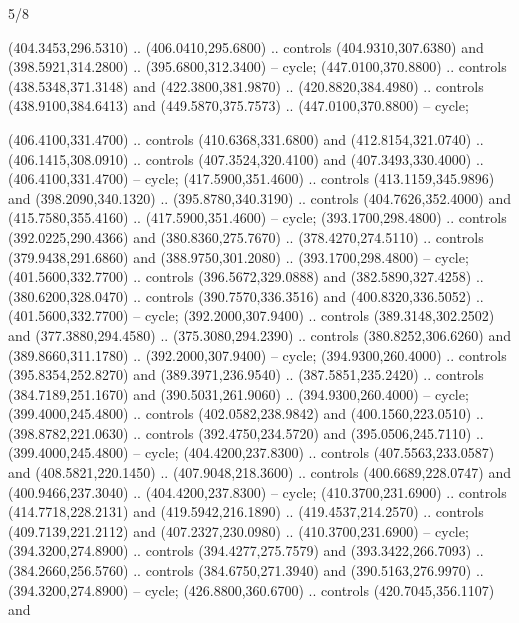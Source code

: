 \begin{flagdescription}{5/8}
\begin{scope}[shift={(0.5\flaglength,0.5\flagwidth)},scale=\flagwidth*\stretchfactor/820]
\begin{scope}[scale=1.84,xshift=-135mm,yshift=84mm]
\begin{scope}[y=0.80pt, x=0.80pt, yscale=-1, xscale=1]
\begin{scope}[cm={{1.01416,0.0,0.0,1.033,(-6.79641,-9.89449)}}]
\begin{scope}[draw=c24420e]
\begin{scope}[line width=0.131\lw]
\begin{scope}[fill=c67923d]
  (404.3453,296.5310) .. (406.0410,295.6800) .. controls (404.9310,307.6380) and
  (398.5921,314.2800) .. (395.6800,312.3400) -- cycle;
 (447.0100,370.8800) .. controls (438.5348,371.3148) and
  (422.3800,381.9870) .. (420.8820,384.4980) .. controls (438.9100,384.6413) and
  (449.5870,375.7573) .. (447.0100,370.8800) -- cycle;
\end{scope}
\begin{scope}[fill=c406325]
 (406.4100,331.4700) .. controls (410.6368,331.6800) and
  (412.8154,321.0740) .. (406.1415,308.0910) .. controls (407.3524,320.4100) and
  (407.3493,330.4000) .. (406.4100,331.4700) -- cycle;
 (417.5900,351.4600) .. controls (413.1159,345.9896) and
  (398.2090,340.1320) .. (395.8780,340.3190) .. controls (404.7626,352.4000) and
  (415.7580,355.4160) .. (417.5900,351.4600) -- cycle;
 (393.1700,298.4800) .. controls (392.0225,290.4366) and
  (380.8360,275.7670) .. (378.4270,274.5110) .. controls (379.9438,291.6860) and
  (388.9750,301.2080) .. (393.1700,298.4800) -- cycle;
 (401.5600,332.7700) .. controls (396.5672,329.0888) and
  (382.5890,327.4258) .. (380.6200,328.0470) .. controls (390.7570,336.3516) and
  (400.8320,336.5052) .. (401.5600,332.7700) -- cycle;
 (392.2000,307.9400) .. controls (389.3148,302.2502) and
  (377.3880,294.4580) .. (375.3080,294.2390) .. controls (380.8252,306.6260) and
  (389.8660,311.1780) .. (392.2000,307.9400) -- cycle;
 (394.9300,260.4000) .. controls (395.8354,252.8270) and
  (389.3971,236.9540) .. (387.5851,235.2420) .. controls (384.7189,251.1670) and
  (390.5031,261.9060) .. (394.9300,260.4000) -- cycle;
 (399.4000,245.4800) .. controls (402.0582,238.9842) and
  (400.1560,223.0510) .. (398.8782,221.0630) .. controls (392.4750,234.5720) and
  (395.0506,245.7110) .. (399.4000,245.4800) -- cycle;
 (404.4200,237.8300) .. controls (407.5563,233.0587) and
  (408.5821,220.1450) .. (407.9048,218.3600) .. controls (400.6689,228.0747) and
  (400.9466,237.3040) .. (404.4200,237.8300) -- cycle;
 (410.3700,231.6900) .. controls (414.7718,228.2131) and
  (419.5942,216.1890) .. (419.4537,214.2570) .. controls (409.7139,221.2112) and
  (407.2327,230.0980) .. (410.3700,231.6900) -- cycle;
 (394.3200,274.8900) .. controls (394.4277,275.7579) and
  (393.3422,266.7093) .. (384.2660,256.5760) .. controls (384.6750,271.3940) and
  (390.5163,276.9970) .. (394.3200,274.8900) -- cycle;
 (426.8800,360.6700) .. controls (420.7045,356.1107) and

\end{scope}
\end{scope}
\end{scope}
\end{scope}
\end{scope}
\end{scope}
\end{scope}
\end{flagdescription}
